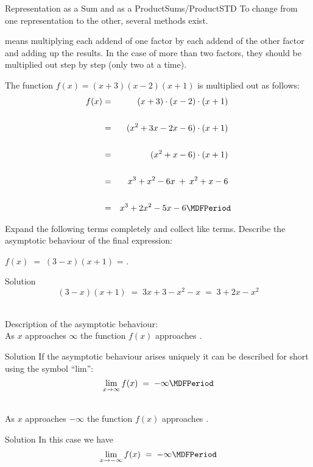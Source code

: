 \begin{MXContent}{Representation as a Sum and as a Product}{Sums/Product}{STD}
To change from one representation to the other, several methods exist.

\begin{MInfo}
 means multiplying each addend of one factor by each addend of the other factor and 
adding up the results. In the case of more than two factors, they should be multiplied out step by step (only two at a time).
\end{MInfo}

\begin{MExample}
The function $f(x)=(x+3)(x-2)(x+1)$ is multiplied out as follows:
\begin{eqnarray*}
f(x)
& = & (x+3)\cdot (x-2)\cdot (x+1) \ \\ \ \\
& = & (x^2+3x-2x-6)\cdot (x+1) \ \\ \ \\
& = & (x^2+x-6)\cdot (x+1) \ \\ \ \\
& = & x^3+x^2-6x\: +\: x^2+x-6 \ \\ \ \\
& = & x^3+2x^2-5x-6 \MDFPeriod
\end{eqnarray*}
\end{MExample}

\begin{MExercise}
Expand the following terms completely and collect like terms. Describe the asymptotic behaviour of the final expression: 
\begin{MExerciseItems}
\item{$f(x)\;=\;(3-x)(x+1)$ = .
\begin{MHint}{Solution}$$(3-x)(x+1) \; = \; 3x + 3 -x^2 -x \;=\; 3 + 2x - x^2 $$\end{MHint}\\

Description of the asymptotic behaviour:\\ 
As $x$ approaches $\infty$ the function $f(x)$ approaches
\;. \begin{MHint}{Solution}%
If the asymptotic behaviour arises uniquely it can be described for short using the symbol ``lim'':
$$\lim_{x\rightarrow \infty} f(x) \; = \; -\infty \MDFPeriod$$\end{MHint}\\  %
As $x$ approaches $-\infty$ the function $f(x)$ approaches
\;. \\
\begin{MHint}{Solution}%
In this case we have 
$$\lim_{x\rightarrow -\infty} f(x) \; = \; -\infty \MDFPeriod$$\end{MHint}

}
\end{MExerciseItems}
\end{MExercise}
\end{MXContent}

